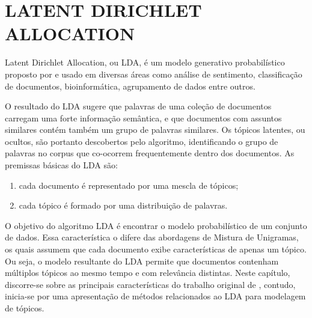 \documentclass[12pt,a4paper]{article}
\begin{document}





\section{LATENT DIRICHLET ALLOCATION} \label{sec:lda}
Latent Dirichlet Allocation, ou LDA, é um modelo generativo probabilístico proposto por  e usado em diversas áreas como análise de sentimento,
 classificação de documentos, bioinformática, agrupamento de dados entre outros. 
 
 O resultado do LDA sugere que palavras de uma coleção de documentos carregam uma forte informação semântica,
 e que documentos com assuntos similares contém também um grupo de palavras similares. Os tópicos latentes, ou ocultos,
 são portanto descobertos pelo algoritmo, identificando o grupo de palavras no corpus que co-ocorrem frequentemente dentro dos documentos. As premissas  básicas do LDA são:

\begin{enumerate}
  \item cada documento é representado por uma mescla de tópicos;
  \item cada tópico é formado por uma distribuição de palavras.
\end{enumerate}

O objetivo do algoritmo LDA é encontrar o modelo probabilístico de um conjunto de dados. Essa característica o difere das abordagens de Mistura de Unigramas, os quais assumem que cada documento exibe características de apenas um tópico. Ou seja, o modelo resultante do LDA  permite que documentos contenham múltiplos tópicos ao mesmo tempo e com relevância distintas. Neste capítulo, discorre-se sobre as principais características do trabalho original de , contudo, inicia-se por uma apresentação de métodos relacionados ao LDA para modelagem de tópicos.
 
\end{document}
